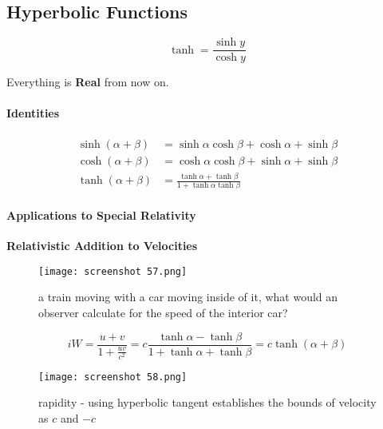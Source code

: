 \documentclass[svgnames]{article}   	%
\begin{document}
\subsection{Hyperbolic Functions}

\[
\tanh = \frac{\sinh y}{\cosh y}
\]

Everything is \textbf{Real} from now on.

\paragraph{Identities} 

\begin{align*}
  \sinh (\alpha + \beta) &= \sinh \alpha \cosh \beta + \cosh \alpha + \sinh
  \beta \\
  \cosh (\alpha + \beta) &= \cosh \alpha \cosh \beta + \sinh \alpha + \sinh
  \beta \\
  \tanh (\alpha + \beta) &= \frac{\tanh \alpha + \tanh \beta}{1 + \tanh \alpha
  \tanh \beta}
\end{align*}

\paragraph{Applications to Special Relativity}

\textbf{Relativistic Addition to Velocities}


\begin{figure}[H]
  \centering
    \texttt{[image: screenshot 57.png]}
    \caption{a train moving with a car moving inside of it, what would an
    observer calculate for the speed of the interior car?}
\end{figure}



\[i
 W = \frac{u + v}{1 + \frac{uv}{c^2}} = c \frac{\tanh \alpha - \tanh\beta}{1
 + \tanh \alpha + \tanh \beta} = c\tanh(\alpha + \beta) 
\]

\begin{figure}[H]
  \centering
    \texttt{[image: screenshot 58.png]}
    \caption{rapidity - using hyperbolic tangent establishes the bounds of
    velocity as $c$ and $-c$}
\end{figure}
\end{document}
